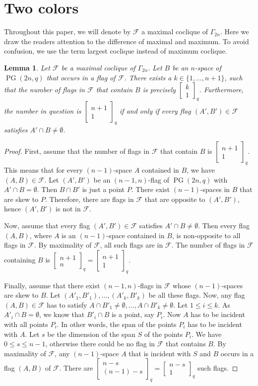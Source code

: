 \documentclass[11pt, oneside, a4paper]{article}
\newtheorem{lemma}[thm]{Lemma}
\newcommand{\EKR}{\mathcal{F}}
\newcommand{\Gauss}[2]{{\begin{bmatrix} #1 \\ #2 \end{bmatrix}_q}}
\DeclareMathOperator{\PG}{PG}
\begin{document}
\section{Two colors}

Throughout this paper, we will denote by $\EKR$ a maximal coclique of $\Gamma_{2n}$.
 Here we draw the readers attention to the difference of maximal and maximum. To avoid confusion, we use the term largest coclique instead of maximum coclique.

\begin{lemma} \label{L: possible weights}
Let $\EKR$ be a maximal coclique of $\Gamma_{2n}$.
    Let $B$ be an $n$-space of $\PG(2n,q)$ that occurs in a flag of $\EKR$. There exists a $k\in\{1,\ldots,n+1\}$, such that the number of flags in $\EKR$ that contain $B$ is precisely $\Gauss{k}{1}$. Furthermore, the number in question is $\Gauss{n+1}{1}$ if and only if every flag $(A',B')\in \EKR$ satisfies $A'\cap B\neq \emptyset$.
\end{lemma}

\begin{proof}
First, assume that the number  of flags in $\EKR$ that contain $B$ is $\Gauss{n+1}{1}$. This means that for every $(n-1)$-space $A$ contained in $B$, we have $(A,B)\in \EKR$. Let $(A',B')$ be an $(n-1,n)$-flag of $\PG(2n,q)$ with $A'\cap B=\emptyset$. Then $B\cap B'$ is just a point $P$. There exist $(n-1)$-spaces in $B$ that are skew to $P$. Therefore, there are flags in $\EKR$ that are opposite to $(A',B')$, hence $(A',B')$ is not in $\EKR$.

    Now, assume that every flag $(A',B')\in \EKR$ satisfies $A'\cap B\neq \emptyset$. Then every flag $(A,B)$, where $A$ is an $(n-1)$-space contained in $B$, is non-opposite to all flags in $\EKR$. By maximality of $\EKR$, all such flags are in $\EKR$. The number of flags in $\EKR$ containing $B$ is $\Gauss{n+1}{n}=\Gauss{n+1}{1}$.

    Finally, assume that there exist $(n-1,n)$-flags in $\EKR$ whose $(n-1)$-spaces are skew to $B$. Let $(A'_1,B'_1),\ldots,(A'_k,B'_k)$ be all these flags. Now, any flag $(A,B)\in \EKR$ has to satisfy $A\cap B'_1\neq\emptyset,\ldots, A\cap B'_k\neq\emptyset$. 
    Let $1\leq i\leq k$.
    As $A'_i\cap B=\emptyset$, we know that $B'_i\cap B$ is a point, say $P_i$.
    Now $A$ has to be incident with all points $P_i$. In other words, the span of the points $P_i$ has to be incident with $A$. Let $s$ be the dimension of the span $S$ of the points $P_i$.
    We have $0\leq s\leq n-1$, otherwise there could be no flag in $\EKR$ that contains $B$. 
    By maximality of $\EKR$, any $(n-1)$-space $A$ that is incident with $S$ and $B$ occurs in a flag $(A,B)$ of $\EKR$. There are $\Gauss{n-s}{(n-1)-s}=\Gauss{n-s}{1}$ such flags.
\end{proof}
\end{document}
